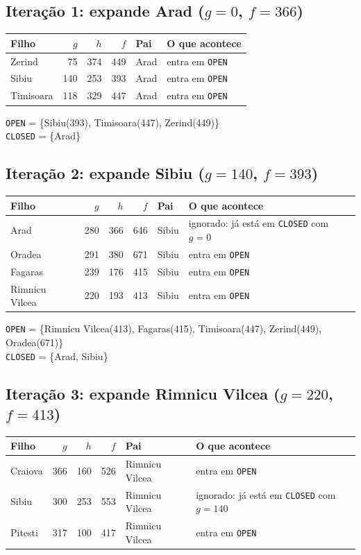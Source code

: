 \documentclass[11pt,a4paper]{article}
\begin{document}
\subsection*{Iteração 1: expande Arad ($g = 0$, $f = 366$)}

\begin{tabularx}{\linewidth}{lrrrlX}
  \toprule
  Filho & $g$ & $h$ & $f$ & Pai & O que acontece \\
  \midrule
  Zerind & 75 & 374 & 449 & Arad & entra em \texttt{OPEN} \\
  Sibiu & 140 & 253 & 393 & Arad & entra em \texttt{OPEN} \\
  Timisoara & 118 & 329 & 447 & Arad & entra em \texttt{OPEN} \\
  \bottomrule
\end{tabularx}

\texttt{OPEN} = \{Sibiu(393), Timisoara(447), Zerind(449)\}\\
\texttt{CLOSED} = \{Arad\}

\subsection*{Iteração 2: expande Sibiu ($g = 140$, $f = 393$)}

\begin{tabularx}{\linewidth}{lrrrlX}
  \toprule
  Filho & $g$ & $h$ & $f$ & Pai & O que acontece \\
  \midrule
  Arad & 280 & 366 & 646 & Sibiu & ignorado: já está em \texttt{CLOSED} com $g = 0$ \\
  Oradea & 291 & 380 & 671 & Sibiu & entra em \texttt{OPEN} \\
  Fagaras & 239 & 176 & 415 & Sibiu & entra em \texttt{OPEN} \\
  Rimnicu Vilcea & 220 & 193 & 413 & Sibiu & entra em \texttt{OPEN} \\
  \bottomrule
\end{tabularx}

\texttt{OPEN} = \{Rimnicu Vilcea(413), Fagaras(415), Timisoara(447), Zerind(449), Oradea(671)\}\\
\texttt{CLOSED} = \{Arad, Sibiu\}

\subsection*{Iteração 3: expande Rimnicu Vilcea ($g = 220$, $f = 413$)}

\begin{tabularx}{\linewidth}{lrrrlX}
  \toprule
  Filho & $g$ & $h$ & $f$ & Pai & O que acontece \\
  \midrule
  Craiova & 366 & 160 & 526 & Rimnicu Vilcea & entra em \texttt{OPEN} \\
  Sibiu & 300 & 253 & 553 & Rimnicu Vilcea & ignorado: já está em \texttt{CLOSED} com $g = 140$ \\
  Pitesti & 317 & 100 & 417 & Rimnicu Vilcea & entra em \texttt{OPEN} \\
  \bottomrule
\end{tabularx}
\end{document}
